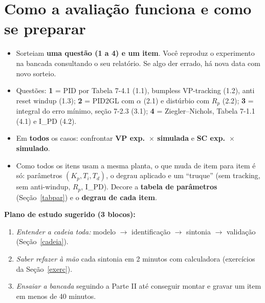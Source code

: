 \documentclass[11pt,a4paper]{article}
\begin{document}
\section{Como a avaliação funciona e como se preparar}
\begin{itemize}
\item Sorteiam \textbf{uma questão (1 a 4) e um item}. Você reproduz o experimento na bancada consultando o seu relatório. Se algo der errado, há nova data com novo sorteio.
\item Questões: \textbf{1} = PID por Tabela 7-4.1 (1.1), bumpless VP-tracking (1.2), anti reset windup (1.3); \textbf{2} = PID2GL com $\alpha$ (2.1) e distúrbio com $R_p$ (2.2); \textbf{3} = integral do erro mínimo, seção 7-2.3 (3.1); \textbf{4} = Ziegler--Nichols, Tabela 7-1.1 (4.1) e I\_PD (4.2).
\item Em \textbf{todos} os casos: confrontar \textbf{VP exp.\ $\times$ simulada} e \textbf{SC exp.\ $\times$ simulado}.
\item Como todos os itens usam a mesma planta, o que muda de item para item é só: parâmetros $(K_p,T_i,T_d)$, o degrau aplicado e um ``truque'' (sem tracking, sem anti-windup, $R_p$, I\_PD). Decore a \textbf{tabela de parâmetros} (Seção~\ref{tabpar}) e o \textbf{degrau de cada item}.
\end{itemize}
\textbf{Plano de estudo sugerido (3 blocos):}
\begin{enumerate}
\item \emph{Entender a cadeia toda:} modelo $\to$ identificação $\to$ sintonia $\to$ validação (Seção~\ref{cadeia}).
\item \emph{Saber refazer à mão} cada sintonia em 2 minutos com calculadora (exercícios da Seção~\ref{exerc}).
\item \emph{Ensaiar a bancada} seguindo a Parte II até conseguir montar e gravar um item em menos de 40 minutos.
\end{enumerate}
\end{document}
